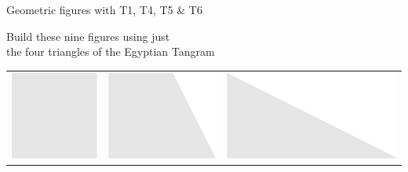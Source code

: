 \documentclass[14pt]{beamer}
\begin{document}

    \begin{frame}{Geometric figures with T1, T4, T5 \& T6}
        \begin{center}
            Build these nine figures using just\\the four triangles of the Egyptian Tangram

            \bigskip\bigskip

            \begin{tabular}{ccc}
                    \includegraphics[scale=0.3]{figures/figure023a.pdf} \;\;&
                \;\;\includegraphics[scale=0.3]{figures/figure023b.pdf} \;\;&
                \;\;\includegraphics[scale=0.3]{figures/figure023c.pdf} \\[2ex]

\end{tabular}
\end{center}
\end{frame}
\end{document}
